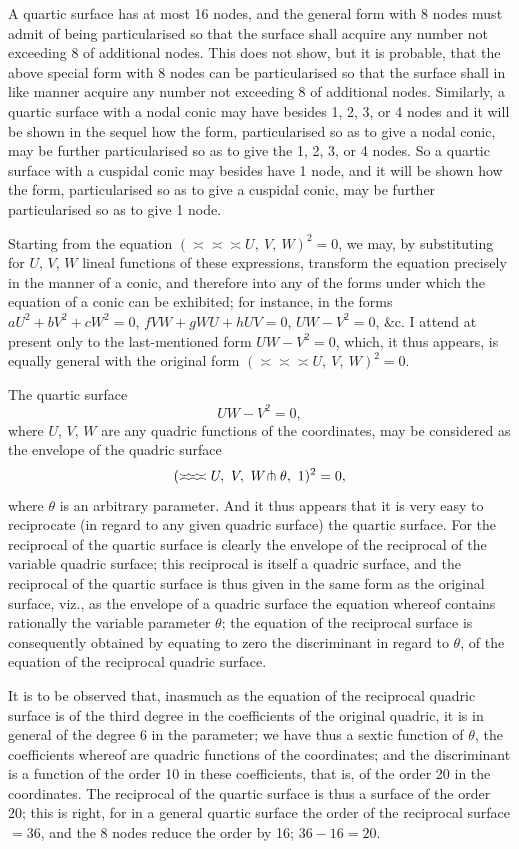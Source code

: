 \documentclass[11pt,a4paper]{article}
\begin{document}
A quartic surface has at most 16 nodes, and the general form with 8 nodes must admit of being particularised so that the surface shall acquire any number not exceeding 8 of additional nodes. This does not show, but it is probable, that the above special form with 8 nodes can be particularised so that the surface shall in like manner acquire any number not exceeding 8 of additional nodes. Similarly, a quartic surface with a nodal conic may have besides 1, 2, 3, or 4 nodes and it will be shown in the sequel how the form, particularised so as to give a nodal conic, may be further particularised so as to give the 1, 2, 3, or 4 nodes. So a quartic surface with a cuspidal conic may besides have 1 node, and it will be shown how the form, particularised so as to give a cuspidal conic, may be further particularised so as to give 1 node.

Starting from the equation $(\asymp\!\asymp\!\asymp U,\ V,\ W)^{2} = 0$, we may, by substituting for $U$, $V$, $W$ lineal functions of these expressions, transform the equation precisely in the manner of a conic, and therefore into any of the forms under which the equation of a conic can be exhibited; for instance, in the forms $aU^{2} + bV^{2} + cW^{2} = 0$, $fVW + gWU + hUV = 0$, $UW - V^{2} = 0$, \&c. I attend at present only to the last-mentioned form $UW - V^{2} = 0$, which, it thus appears, is equally general with the original form $(\asymp\!\asymp\!\asymp U,\ V,\ W)^{2} = 0$.

The quartic surface
\[
UW - V^{2} = 0,
\]
where $U$, $V$, $W$ are any quadric functions of the coordinates, may be considered as the envelope of the quadric surface
\[
(\asymp\!\asymp\!\asymp U,\ V,\ W \hspace{-0.2em}\pitchfork \theta,\ 1)^{2} = 0,
\]
where $\theta$ is an arbitrary parameter. And it thus appears that it is very easy to reciprocate (in regard to any given quadric surface) the quartic surface. For the reciprocal of the quartic surface is clearly the envelope of the reciprocal of the variable quadric surface; this reciprocal is itself a quadric surface, and the reciprocal of the quartic surface is thus given in the same form as the original surface, viz., as the envelope of a quadric surface the equation whereof contains rationally the variable parameter $\theta$; the equation of the reciprocal surface is consequently obtained by equating to zero the discriminant in regard to $\theta$, of the equation of the reciprocal quadric surface.

It is to be observed that, inasmuch as the equation of the reciprocal quadric surface is of the third degree in the coefficients of the original quadric, it is in general of the degree 6 in the parameter; we have thus a sextic function of $\theta$, the coefficients whereof are quadric functions of the coordinates; and the discriminant is a function of the order 10 in these coefficients, that is, of the order 20 in the coordinates. The reciprocal of the quartic surface is thus a surface of the order 20; this is right, for in a general quartic surface the order of the reciprocal surface $= 36$, and the 8 nodes reduce the order by 16; $36 - 16 = 20$.
\end{document}
